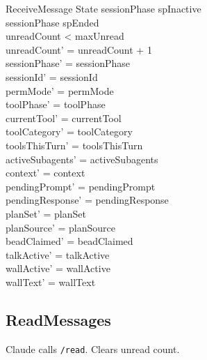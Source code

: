 \documentclass[a4paper,10pt,fleqn]{article}
\begin{document}
\begin{schema}{ReceiveMessage}
  \Delta State
  \where
  sessionPhase \neq spInactive \\
  sessionPhase \neq spEnded \\
  unreadCount < maxUnread \\
  unreadCount' = unreadCount + 1 \\
  sessionPhase' = sessionPhase \\
  sessionId' = sessionId \\
  permMode' = permMode \\
  toolPhase' = toolPhase \\
  currentTool' = currentTool \\
  toolCategory' = toolCategory \\
  toolsThisTurn' = toolsThisTurn \\
  activeSubagents' = activeSubagents \\
  context' = context \\
  pendingPrompt' = pendingPrompt \\
  pendingResponse' = pendingResponse \\
  planSet' = planSet \\
  planSource' = planSource \\
  beadClaimed' = beadClaimed \\
  talkActive' = talkActive \\
  wallActive' = wallActive \\
  wallText' = wallText
\end{schema}

\subsection{ReadMessages}

Claude calls \texttt{/read}. Clears unread count.
\end{document}

